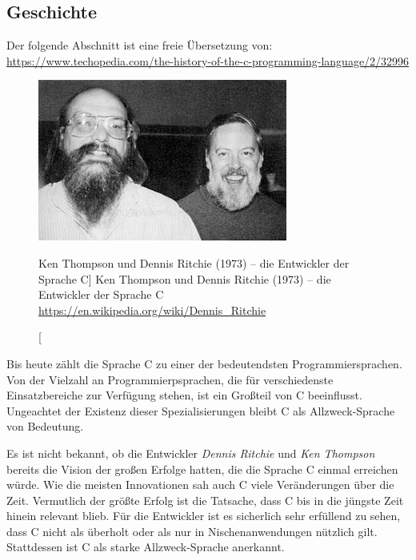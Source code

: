 \begin{appendices}
\chapter{Geschichte}
Der folgende Abschnitt ist eine freie Übersetzung von:\\
\url{https://www.techopedia.com/the-history-of-the-c-programming-language/2/32996}

\begin{figure}
	\includegraphics[width=\linewidth]{./gfx/KTDR}
	\caption%
		[Ken Thompson und Dennis Ritchie (1973) -- die Entwickler der Sprache C]
		{Ken Thompson und Dennis Ritchie (1973) -- die Entwickler der Sprache C\newline
		\url{https://en.wikipedia.org/wiki/Dennis_Ritchie}}
	\vspace{-20pt}
\end{figure}
Bis heute zählt die Sprache C zu einer der bedeutendsten Programmiersprachen. Von der Vielzahl an  Programmierpsprachen, die für verschiedenste Einsatzbereiche zur Verfügung stehen, ist ein Großteil von C beeinflusst. Ungeachtet der Existenz dieser Spezialisierungen bleibt C als Allzweck-Sprache von Bedeutung.

Es ist nicht bekannt, ob die Entwickler \emph{Dennis Ritchie} und \emph{Ken Thompson} bereits die Vision der großen Erfolge hatten, die die Sprache C einmal erreichen würde. Wie die meisten Innovationen sah auch C viele Veränderungen über die Zeit. Vermutlich der größte Erfolg ist die Tatsache, dass C bis in die jüngste Zeit hinein relevant blieb. Für die Entwickler ist es sicherlich sehr erfüllend zu sehen, dass C nicht als überholt oder als nur in Nischenanwendungen nützlich gilt. Stattdessen ist C als starke Allzweck-Sprache anerkannt.


\end{appendices}
